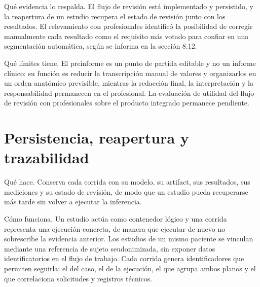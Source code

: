 Qué evidencia lo respalda. El flujo de revisión está implementado y persistido, y la reapertura de un estudio recupera el estado de revisión junto con los resultados. El relevamiento con profesionales identificó la posibilidad de corregir manualmente cada resultado como el requisito más votado para confiar en una segmentación automática, según se informa en la sección 8.12.

Qué límites tiene. El preinforme es un punto de partida editable y no un informe clínico: su función es reducir la transcripción manual de valores y organizarlos en un orden anatómico previsible, mientras la redacción final, la interpretación y la responsabilidad permanecen en el profesional. La evaluación de utilidad del flujo de revisión con profesionales sobre el producto integrado permanece pendiente.

\section{Persistencia, reapertura y trazabilidad}

Qué hace. Conserva cada corrida con su modelo, su artifact, sus resultados, sus mediciones y su estado de revisión, de modo que un estudio pueda recuperarse más tarde sin volver a ejecutar la inferencia.

Cómo funciona. Un estudio actúa como contenedor lógico y una corrida representa una ejecución concreta, de manera que ejecutar de nuevo no sobrescribe la evidencia anterior. Los estudios de un mismo paciente se vinculan mediante una referencia de sujeto seudonimizada, sin exponer datos identificatorios en el flujo de trabajo. Cada corrida genera identificadores que permiten seguirla: el del caso, el de la ejecución, el que agrupa ambos planos y el que correlaciona solicitudes y registros técnicos.

